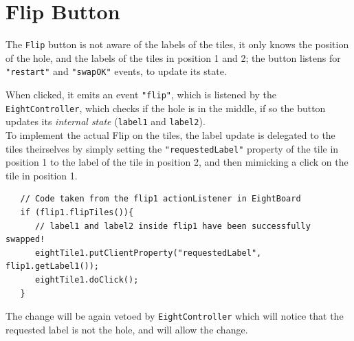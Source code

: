 
\section{Flip Button}

The \lstinline|Flip| button is not aware of the labels of the tiles, it only knows the position of the hole, and the labels of the tiles in position 1 and 2; the button listens for \lstinline|"restart"| and \lstinline|"swapOK"| events, to update its state.

When clicked, it emits an event \lstinline|"flip"|, which is listened by the \lstinline|EightController|, which checks if the hole is in the middle, if so the button updates its \textit{internal state} (\lstinline|label1| and \lstinline|label2|).\\
To implement the actual Flip on the tiles, the label update is delegated to the tiles theirselves by simply setting the \lstinline|"requestedLabel"| property of the tile in position 1 to the label of the tile in position 2, and then mimicking a click on the tile in position 1.

\begin{lstlisting}
   // Code taken from the flip1 actionListener in EightBoard
   if (flip1.flipTiles()){
      // label1 and label2 inside flip1 have been successfully swapped!
      eightTile1.putClientProperty("requestedLabel", flip1.getLabel1());
      eightTile1.doClick();
   }
\end{lstlisting}

The change will be again vetoed by \lstinline|EightController| which will notice that the requested label is not the hole, and will allow the change.
